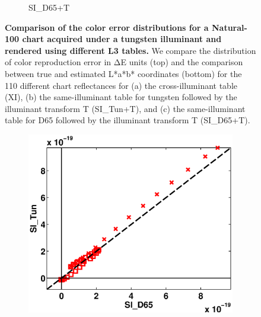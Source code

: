 \documentclass[]{spie}
\begin{document}
\begin{figure}
\begin{subfigure}[b]{0.325\textwidth}
    \caption{SI\_D65+T}
\end{subfigure}
\caption{\textbf{Comparison of the color error distributions for a Natural-100 chart acquired under a tungsten illuminant and rendered using different L3 tables.} We compare the distribution of color reproduction error in ΔE units (top) and the comparison between true and estimated L*a*b* coordinates (bottom) for the 110 different chart reflectances for (a) the cross-illuminant table (XI), (b) the same-illuminant table for tungsten followed by the illuminant transform T (SI\_Tun+T), and (c) the same-illuminant table for D65 followed by the illuminant transform T (SI\_D65+T).}
\label{fig:colorStatisticsPlot}
\end{figure}

\begin{figure}
\begin{center}
\begin{subfigure}[b]{0.325\textwidth}
    \includegraphics[width=\textwidth]{color_Statistics_r}
\end{subfigure}
\begin{subfigure}[b]{0.325\textwidth}

\end{subfigure}
\end{center}
\end{figure}
\end{document}
